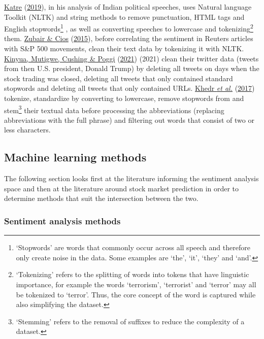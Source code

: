 \documentclass[11pt,preprint, authoryear]{elsarticle}
\numberwithin{equation}{section}
\numberwithin{figure}{section}
\numberwithin{table}{section}
\let\rmarkdownfootnote\footnote%
\def\footnote{\protect\rmarkdownfootnote}
\begin{document}
\protect\hyperlink{ref-katre2019nlp}{Katre}
(\protect\hyperlink{ref-katre2019nlp}{2019}), in his analysis of Indian
political speeches, uses Natural language Toolkit (NLTK) and string
methods to remove punctuation, HTML tags and English
stopwords\footnote{`Stopwords' are words that commonly occur across all
  speech and therefore only create noise in the data. Some examples are
  `the', `it', `they' and `and'.} , as well as converting speeches to
lowercase and tokenizing\footnote{`Tokenizing' refers to the splitting
  of words into tokens that have linguistic importance, for example the
  words `terrorism', `terrorist' and `terror' may all be tokenized to
  `terror'. Thus, the core concept of the word is captured while also
  simplifying the dataset.} them.
\protect\hyperlink{ref-zubair2015extracting}{Zubair \& Cios}
(\protect\hyperlink{ref-zubair2015extracting}{2015}), before correlating
the sentiment in Reuters articles with S\&P 500 movements, clean their
text data by tokenizing it with NLTK.
\protect\hyperlink{ref-kinyua2021analysis}{Kinyua, Mutigwe, Cushing \&
Poggi} (\protect\hyperlink{ref-kinyua2021analysis}{2021}) (2021) clean
their twitter data (tweets from then U.S. president, Donald Trump) by
deleting all tweets on days when the stock trading was closed, deleting
all tweets that only contained standard stopwords and deleting all
tweets that only contained URLs.
\protect\hyperlink{ref-khedr2017predicting}{Khedr \emph{et al.}}
(\protect\hyperlink{ref-khedr2017predicting}{2017}) tokenize,
standardize by converting to lowercase, remove stopwords from and
stem\footnote{`Stemming' refers to the removal of suffixes to reduce the
  complexity of a dataset.} their textual data before processing the
abbreviations (replacing abbreviations with the full phrase) and
filtering out words that consist of two or less characters.

\hypertarget{machine-learning-methods}{%
\subsection{\texorpdfstring{Machine learning methods
\label{ML}}{Machine learning methods }}\label{machine-learning-methods}}

The following section looks first at the literature informing the
sentiment analysis space and then at the literature around stock market
prediction in order to determine methods that suit the intersection
between the two.

\hypertarget{sentiment-analysis-methods}{%
\subsubsection{\texorpdfstring{Sentiment analysis methods
\label{sentAnal}}{Sentiment analysis methods }}\label{sentiment-analysis-methods}}
\end{document}

